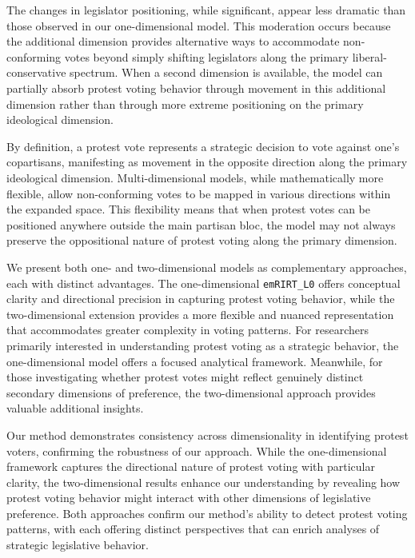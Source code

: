 \documentclass[11pt]{article}
\begin{document}
The changes in legislator positioning, while significant, appear less dramatic than those observed in our one-dimensional model. This moderation occurs because the additional dimension provides alternative ways to accommodate non-conforming votes beyond simply shifting legislators along the primary liberal-conservative spectrum. When a second dimension is available, the model can partially absorb protest voting behavior through movement in this additional dimension rather than through more extreme positioning on the primary ideological dimension.

By definition, a protest vote represents a strategic decision to vote against one's copartisans, manifesting as movement in the opposite direction along the primary ideological dimension. Multi-dimensional models, while mathematically more flexible, allow non-conforming votes to be mapped in various directions within the expanded space. This flexibility means that when protest votes can be positioned anywhere outside the main partisan bloc, the model may not always preserve the oppositional nature of protest voting along the primary dimension.

We present both one- and two-dimensional models as complementary approaches, each with distinct advantages. The one-dimensional \texttt{emRIRT\_L0} offers conceptual clarity and directional precision in capturing protest voting behavior, while the two-dimensional extension provides a more flexible and nuanced representation that accommodates greater complexity in voting patterns. For researchers primarily interested in understanding protest voting as a strategic behavior, the one-dimensional model offers a focused analytical framework. Meanwhile, for those investigating whether protest votes might reflect genuinely distinct secondary dimensions of preference, the two-dimensional approach provides valuable additional insights.

Our method demonstrates consistency across dimensionality in identifying protest voters, confirming the robustness of our approach. While the one-dimensional framework captures the directional nature of protest voting with particular clarity, the two-dimensional results enhance our understanding by revealing how protest voting behavior might interact with other dimensions of legislative preference. Both approaches confirm our method's ability to detect protest voting patterns, with each offering distinct perspectives that can enrich analyses of strategic legislative behavior.

\end{document}
